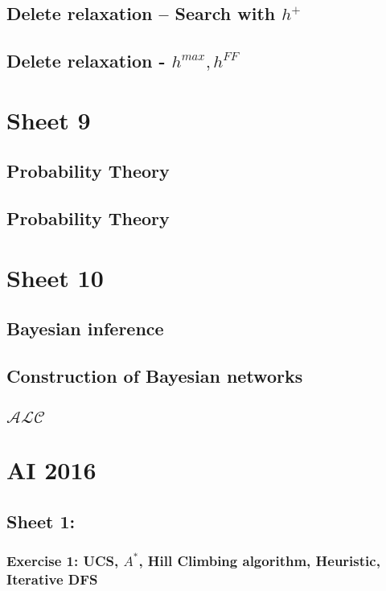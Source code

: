 \documentclass{article}
\begin{document}
    \subsection{Delete relaxation – Search with $h^+$}
    \subsection{Delete relaxation - $h^{max},h^{FF}$}
    

\section{Sheet 9}
    \subsection{Probability Theory}
    \subsection{Probability Theory}
    

\section{Sheet 10}
    \subsection{Bayesian inference}
    \subsection{Construction of Bayesian networks}
    \subsection{$\mathcal{ALC}$}
    



\section{AI 2016}
    \subsection{Sheet 1:}
        \subsubsection{Exercise 1: UCS, $A^*$, Hill Climbing algorithm, Heuristic, Iterative DFS}
\end{document}
